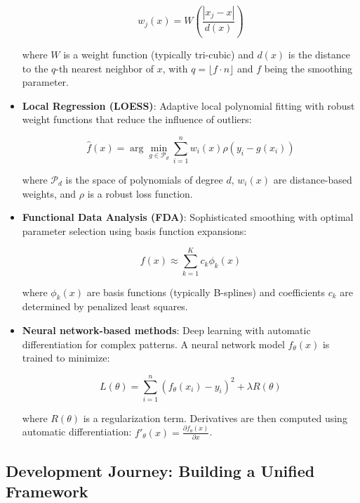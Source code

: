\documentclass[10pt,journal,compsoc]{IEEEtran}
\begin{document}
\begin{itemize}
    \begin{equation}
        w_j(x) = W\left(\frac{|x_j - x|}{d(x)}\right)
    \end{equation}
    
    where $W$ is a weight function (typically tri-cubic) and $d(x)$ is the distance to the $q$-th nearest neighbor of $x$, with $q = \lfloor f \cdot n \rfloor$ and $f$ being the smoothing parameter.
    
    \item \textbf{Local Regression (LOESS)}: Adaptive local polynomial fitting with robust weight functions that reduce the influence of outliers:
    
    \begin{equation}
        \hat{f}(x) = \arg\min_{g \in \mathcal{P}_d} \sum_{i=1}^{n} w_i(x) \rho\left(y_i - g(x_i)\right)
    \end{equation}
    
    where $\mathcal{P}_d$ is the space of polynomials of degree $d$, $w_i(x)$ are distance-based weights, and $\rho$ is a robust loss function.
    
    \item \textbf{Functional Data Analysis (FDA)}: Sophisticated smoothing with optimal parameter selection using basis function expansions:
    
    \begin{equation}
        f(x) \approx \sum_{k=1}^{K} c_k \phi_k(x)
    \end{equation}
    
    where $\phi_k(x)$ are basis functions (typically B-splines) and coefficients $c_k$ are determined by penalized least squares.
    
    \item \textbf{Neural network-based methods}: Deep learning with automatic differentiation for complex patterns. A neural network model $f_{\theta}(x)$ is trained to minimize:
    
    \begin{equation}
        L(\theta) = \sum_{i=1}^{n} \left(f_{\theta}(x_i) - y_i\right)^2 + \lambda R(\theta)
    \end{equation}
    
    where $R(\theta)$ is a regularization term. Derivatives are then computed using automatic differentiation: $f'_{\theta}(x) = \frac{\partial f_{\theta}(x)}{\partial x}$.
\end{itemize}

\subsection{Development Journey: Building a Unified Framework}
\end{document}
